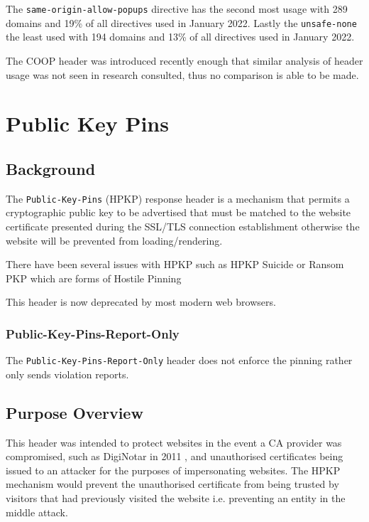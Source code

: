 \documentclass{mscreport}
\begin{document}
\vspace{0.3cm} \noindent
The \texttt{same-origin-allow-popups} directive has the second most usage with 289 domains and 19\% of all directives used in January 2022. Lastly the \texttt{unsafe-none} the least used with 194 domains and 13\% of all directives used in January 2022.

\vspace{0.3cm} \noindent
The COOP header was introduced recently enough that similar analysis of header usage was not seen in research consulted, thus no comparison is able to be made.

\clearpage
\newpage


\section{Public Key Pins}
\label{section:hpkp}

\subsection{Background}

The \texttt{Public-Key-Pins} (HPKP) response header is a mechanism that permits a cryptographic public key to be advertised that must be matched to the website certificate presented during the SSL/TLS connection establishment otherwise the website will be prevented from loading/rendering.

\vspace{0.3cm} \noindent
There have been several issues with HPKP such as HPKP Suicide \cite{Chen2018-ft,Chuat2021-nf} or Ransom PKP \cite{Chuat2021-nf} which are forms of Hostile Pinning \cite{Evans2018-mi}

\vspace{0.3cm} \noindent
This header is now deprecated by most modern web browsers.

\subsubsection{Public-Key-Pins-Report-Only}
The \texttt{Public-Key-Pins-Report-Only} header does not enforce the pinning rather only sends violation reports.

\subsection{Purpose Overview}

\noindent
This header was intended to protect websites in the event a CA provider was compromised, such as DigiNotar in 2011 \cite{Amann2017-co}, and unauthorised certificates being issued to an attacker for the purposes of impersonating websites. The HPKP mechanism would prevent the unauthorised certificate from being trusted by visitors that had previously visited the website i.e. preventing an entity in the middle attack.
\end{document}
